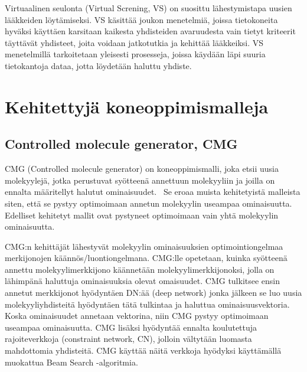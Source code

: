 \documentclass[finnish,twoside,censored,subject,sw-line]{HYthesisML}
\begin{document}
Virtuaalinen seulonta (Virtual Screning, VS) on suosittu lähestymistapa uusien lääkkeiden löytämiseksi.
VS käsittää joukon menetelmiä, joissa tietokoneita hyväksi käyttäen karsitaan kaikesta yhdisteiden avaruudesta vain tietyt kriteerit täyttävät yhdisteet, joita voidaan jatkotutkia ja kehittää lääkkeiksi.
VS menetelmillä tarkoitetaan yleisesti prosesseja, joissa käydään läpi suuria tietokantoja dataa, jotta löydetään haluttu yhdiste.~\cite{SotrifferChristoph2011VSPC}



\section{Kehitettyjä koneoppimismalleja}


\subsection{Controlled molecule generator, CMG}

CMG (Controlled molecule generator) on koneoppimismalli, joka etsii uusia molekyylejä, jotka perustuvat syötteenä annettuun molekyyliin ja joilla on ennalta määritellyt halutut ominaisuudet.~\cite{ShinBonggun}
Se eroaa muista kehitetyistä malleista siten, että se pystyy optimoimaan annetun molekyylin useampaa ominaisuutta.
Edelliset kehitetyt mallit ovat pystyneet optimoimaan vain yhtä molekyylin ominaisuutta.

CMG:n kehittäjät lähestyvät molekyylin ominaisuuksien optimointiongelmaa merkijonojen käännös/luontiongelmana.
CMG:lle opetetaan, kuinka syötteenä annettu molekyylimerkkijono käännetään molekyylimerkkijonoksi, jolla on lähimpänä haluttuja ominaisuuksia olevat omaisuudet.
CMG tulkitsee ensin annetut merkkijonot hyödyntäen DN:ää (deep network) jonka jälkeen se luo uusia molekyyliyhdisteitä hyödyntäen tätä tulkintaa ja haluttua ominaisuusvektoria.
Koska ominaisuudet annetaan vektorina, niin CMG pystyy optimoimaan useampaa ominaisuutta.
CMG lisäksi hyödyntää ennalta koulutettuja rajoiteverkkoja (constraint network, CN), jolloin vältytään luomasta mahdottomia yhdisteitä.
CMG käyttää näitä verkkoja hyödyksi käyttämällä muokattua Beam Search -algoritmia.
\end{document}
